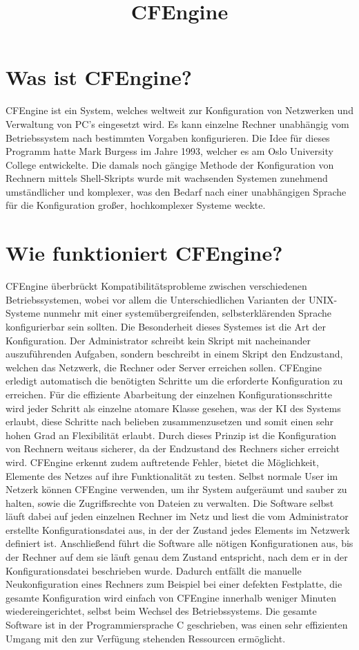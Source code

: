 \documentclass[12pt]{report}
\begin{document}
\title{CFEngine}
\section{Was ist CFEngine?}
CFEngine ist ein System, welches weltweit zur Konfiguration von Netzwerken und Verwaltung von PC's eingesetzt wird. Es kann einzelne Rechner unabhängig vom Betriebssystem nach bestimmten Vorgaben konfigurieren. Die Idee für dieses Programm hatte Mark Burgess im Jahre 1993, welcher es am Oslo University College entwickelte. Die damals noch gängige Methode der Konfiguration von Rechnern mittels Shell-Skripts wurde mit wachsenden Systemen zunehmend umständlicher und komplexer, was den Bedarf nach einer unabhängigen Sprache für die Konfiguration großer, hochkomplexer Systeme weckte.
\section{Wie funktioniert CFEngine?}
CFEngine überbrückt Kompatibilitätsprobleme zwischen verschiedenen Betriebssystemen, wobei vor allem die Unterschiedlichen Varianten der UNIX-Systeme nunmehr mit einer systemübergreifenden, selbsterklärenden Sprache konfigurierbar sein sollten. Die Besonderheit dieses Systemes ist die Art der Konfiguration. Der Administrator schreibt kein Skript mit nacheinander auszuführenden Aufgaben, sondern beschreibt in einem Skript den Endzustand, welchen das Netzwerk, die Rechner oder Server erreichen sollen. CFEngine erledigt automatisch die benötigten Schritte um die erforderte Konfiguration zu erreichen. Für die effiziente Abarbeitung der einzelnen Konfigurationsschritte wird jeder Schritt als einzelne atomare Klasse gesehen, was der KI des Systems erlaubt, diese Schritte nach belieben zusammenzusetzen und somit einen sehr hohen Grad an Flexibilität erlaubt.
Durch dieses Prinzip ist die Konfiguration von Rechnern weitaus sicherer, da der Endzustand des Rechners sicher erreicht wird. CFEngine erkennt zudem auftretende Fehler, bietet die Möglichkeit, Elemente des Netzes auf ihre Funktionalität zu testen. Selbst normale User im Netzerk können CFEngine verwenden, um ihr System aufgeräumt und sauber zu halten, sowie die Zugriffsrechte von Dateien zu verwalten.
Die Software selbst läuft dabei auf jeden einzelnen Rechner im Netz und liest die vom Administrator erstellte Konfigurationsdatei aus, in der der Zustand jedes Elements im Netzwerk definiert ist. Anschließend führt die Software alle nötigen Konfigurationen aus, bis der Rechner auf dem sie läuft genau dem Zustand entspricht, nach dem er in der Konfigurationsdatei beschrieben wurde. Dadurch entfällt die manuelle Neukonfiguration eines Rechners zum Beispiel bei einer defekten Festplatte, die gesamte Konfiguration wird einfach von CFEngine innerhalb weniger Minuten wiedereingerichtet, selbst beim Wechsel des Betriebssystems.
Die gesamte Software ist in der Programmiersprache C geschrieben, was einen sehr effizienten Umgang mit den zur Verfügung stehenden Ressourcen ermöglicht.
\end{document}

